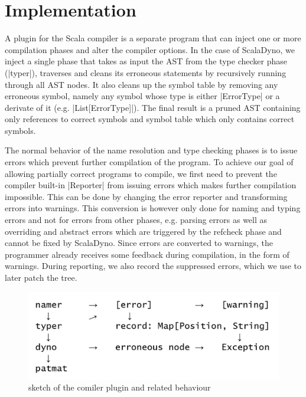 \section{Implementation}

A plugin for the Scala compiler is a separate program that can inject one or more compilation phases and alter the compiler options. In the case of ScalaDyno, we inject a single phase that takes as input the AST from the type checker phase (|typer|), traverses and cleans its erroneous statements by recursively running through all AST nodes. It also cleans up the symbol table by removing any erroneous symbol, namely any symbol whose type is either |ErrorType| or a derivate of it (e.g. |List[ErrorType]|). The final result is a pruned AST containing only references to correct symbols and symbol table which only contains correct symbols.

The normal behavior of the name resolution and type checking phases is to issue errors which prevent further compilation of the program. To achieve our goal of allowing partially correct programs to compile, we first need to prevent the compiler built-in |Reporter| from issuing errors which makes further compilation impossible. This can be done by changing the error reporter and transforming errors into warnings. This conversion is however only done for naming and typing errors and not for errors from other phases, e.g. parsing errors as well as overriding and abstract errors which are triggered by the refcheck phase and cannot be fixed by ScalaDyno. Since errors are converted to warnings, the programmer already receives some feedback during compilation, in the form of warnings. During reporting, we also record the suppressed errors, which we use to later patch the tree.

\begin{figure}[h]
\includegraphics[width=0.9\columnwidth]{compiler_structure.png}
\caption[structure sketch]
   {sketch of the comiler plugin and related behaviour}
\vspace{-15mm}
\end{figure}

